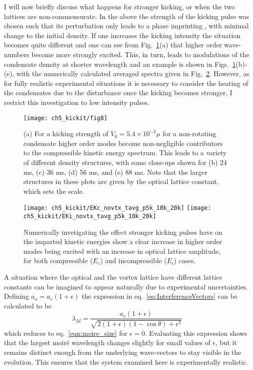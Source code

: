     I will now briefly discuss what happens for stronger kicking, or when the two lattices are non-commensurate. In the above the strength of the kicking pulse was chosen such that its perturbation only leads to a phase imprinting \cite{Vtx:Dobrek_pra_1999,BEC:Denschlag_sci_2000}, with minimal change to the initial density. If one increases the kicking intensity the situation becomes quite different and one can see from Fig.~\ref{fig:kickp20k}(a) that higher order wave-numbers become more strongly excited. This, in turn, leads to modulations of the condensate density at shorter wavelength and an example is shown in Figs.~\ref{fig:kickp20k}(b)-(e), with the numerically calculated averaged spectra given in Fig.~\ref{fig:kick_compare_spec}. However, as for fully realistic experimental situations it is necessary to consider the heating of the condensates due to the disturbance once the kicking becomes stronger, I restrict this investigation to low intensity pulses.

\begin{figure}[tb]
    \centering
	\texttt{[image: ch5\_kickit/fig8]}
	\caption[Higher order modes induced by stronger kicking.]{(a) For a kicking strength of $V_0 = 5.4\times10^{-2}\mu$ for a non-rotating condensate higher order modes become non-negligible contributors to the compressible kinetic energy spectrum. This leads to a variety of different density structures, with some close-ups shown for (b) 24 ms, (c) 36 ms, (d) 56 ms, and (e) 88 ms. Note that the larger structures in these plots are given by the optical lattice constant, which sets the scale.}
	\label{fig:kickp20k}
\end{figure}
\begin{figure}[tb]
    \centering
    \texttt{[image: ch5\_kickit/EKc\_novtx\_tavg\_p5k\_10k\_20k]}
    \texttt{[image: ch5\_kickit/EKi\_novtx\_tavg\_p5k\_10k\_20k]}
	\caption[Comparison of kinetic energy spectra for increased kicking strengths.]{Numerically invetigating the effect stronger kicking pulses have on the imparted kinetic energies show a clear increase in higher order modes being excited with an increase in optical lattice amplitude, for both compressible ($E_c$) and incompressible ($E_i$) cases.}\label{fig:kick_compare_spec}
\end{figure}

    A situation where the optical and the vortex lattice have different lattice constants can be imagined to appear naturally due to experimental uncertainties. Defining $a_o = a_v(1+\epsilon)$ the expression in eq.~\eqref{eq:InterferenceVectors} can be calculated to be
    \begin{equation}
    	\lambda_M = \frac{a_v(1+\epsilon)}{\sqrt{2(1+\epsilon)(1-\cos\theta) + \epsilon^2}}
    	\label{eqn:moire_size_eps}
    \end{equation}
    which reduces to eq.~\eqref{eqn:moire_size} for $\epsilon=0$. Evaluating this expression shows that the largest moir\'e wavelength changes slightly for small values of $\epsilon$, but it remains distinct enough from the underlying wave-vectors to stay visible in the evolution. This ensures that the system examined here is experimentally realistic.

